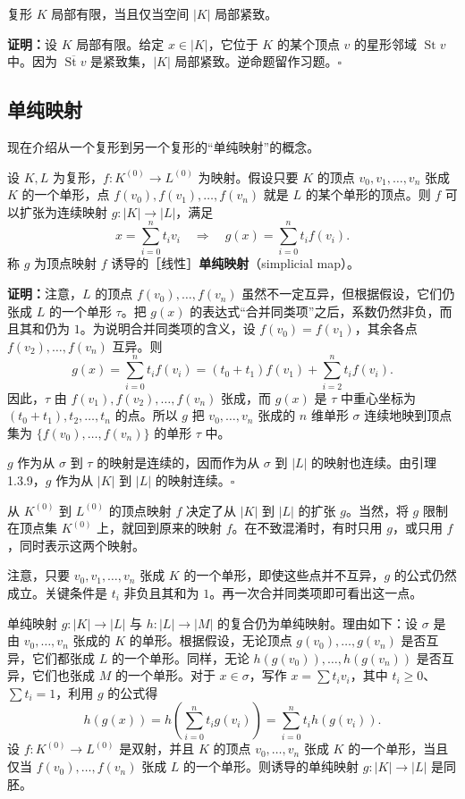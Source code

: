 复形 $K$ 局部有限，当且仅当空间 $|K|$ 局部紧致。

\noindent\textbf{证明：}设 $K$ 局部有限。给定 $x\in|K|$，它位于 $K$ 的某个顶点 $v$ 的星形邻域 $\operatorname{St}v$ 中。因为 $\overline{\operatorname{St}v}$ 是紧致集，$|K|$ 局部紧致。逆命题留作习题。\hfill$\square$

\subsection*{单纯映射}
现在介绍从一个复形到另一个复形的“单纯映射”的概念。

设 $K,L$ 为复形，$f:K^{(0)}\to L^{(0)}$ 为映射。假设只要 $K$ 的顶点 $v_0,v_1,\ldots,v_n$ 张成 $K$ 的一个单形，点 $f(v_0),f(v_1),\ldots,f(v_n)$ 就是 $L$ 的某个单形的顶点。则 $f$ 可以扩张为连续映射 $g:|K|\to|L|$，满足
\[
x=\sum_{i=0}^n t_i v_i\quad\Longrightarrow\quad
g(x)=\sum_{i=0}^n t_i f(v_i).
\]
称 $g$ 为顶点映射 $f$ 诱导的［线性］\textbf{单纯映射}（simplicial map）。

\noindent\textbf{证明：}注意，$L$ 的顶点 $f(v_0),\ldots,f(v_n)$ 虽然不一定互异，但根据假设，它们仍张成 $L$ 的一个单形 $\tau$。把 $g(x)$ 的表达式“合并同类项”之后，系数仍然非负，而且其和仍为 $1$。为说明合并同类项的含义，设 $f(v_0)=f(v_1)$，其余各点 $f(v_2),\ldots,f(v_n)$ 互异。则
\[
g(x)=\sum_{i=0}^n t_i f(v_i)
=(t_0+t_1)f(v_1)+\sum_{i=2}^n t_i f(v_i).
\]
因此，$\tau$ 由 $f(v_1),f(v_2),\ldots,f(v_n)$ 张成，而 $g(x)$ 是 $\tau$ 中重心坐标为 $(t_0+t_1),t_2,\ldots,t_n$ 的点。所以 $g$ 把 $v_0,\ldots,v_n$ 张成的 $n$ 维单形 $\sigma$ 连续地映到顶点集为 $\{f(v_0),\ldots,f(v_n)\}$ 的单形 $\tau$ 中。

$g$ 作为从 $\sigma$ 到 $\tau$ 的映射是连续的，因而作为从 $\sigma$ 到 $|L|$ 的映射也连续。由引理 1.3.9，$g$ 作为从 $|K|$ 到 $|L|$ 的映射连续。\hfill$\square$

从 $K^{(0)}$ 到 $L^{(0)}$ 的顶点映射 $f$ 决定了从 $|K|$ 到 $|L|$ 的扩张 $g$。当然，将 $g$ 限制在顶点集 $K^{(0)}$ 上，就回到原来的映射 $f$。在不致混淆时，有时只用 $g$，或只用 $f$，同时表示这两个映射。

注意，只要 $v_0,v_1,\ldots,v_n$ 张成 $K$ 的一个单形，即使这些点并不互异，$g$ 的公式仍然成立。关键条件是 $t_i$ 非负且其和为 $1$。再一次合并同类项即可看出这一点。

单纯映射 $g:|K|\to|L|$ 与 $h:|L|\to|M|$ 的复合仍为单纯映射。理由如下：设 $\sigma$ 是由 $v_0,\ldots,v_n$ 张成的 $K$ 的单形。根据假设，无论顶点 $g(v_0),\ldots,g(v_n)$ 是否互异，它们都张成 $L$ 的一个单形。同样，无论 $h(g(v_0)),\ldots,h(g(v_n))$ 是否互异，它们也张成 $M$ 的一个单形。对于 $x\in\sigma$，写作 $x=\sum t_i v_i$，其中 $t_i\geq0$、$\sum t_i=1$，利用 $g$ 的公式得
\[
h(g(x))=h\left(\sum_{i=0}^n t_i g(v_i)\right)
=\sum_{i=0}^n t_i h(g(v_i)).
\]
设 $f:K^{(0)}\to L^{(0)}$ 是双射，并且 $K$ 的顶点 $v_0,\ldots,v_n$ 张成 $K$ 的一个单形，当且仅当 $f(v_0),\ldots,f(v_n)$ 张成 $L$ 的一个单形。则诱导的单纯映射 $g:|K|\to|L|$ 是同胚。

